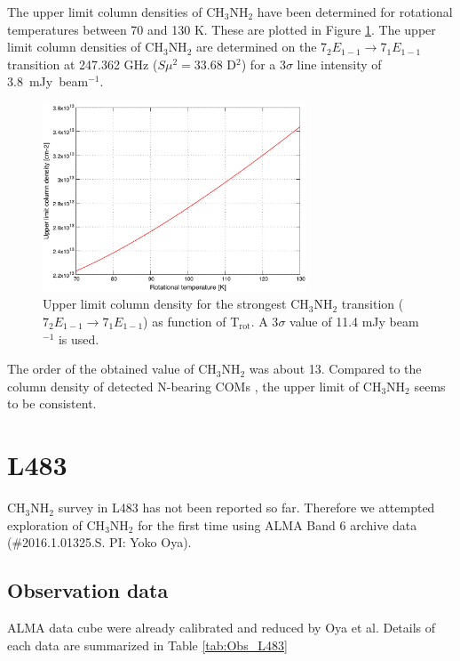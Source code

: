 The upper limit column densities of CH$_{3}$NH$_{2}$ have been
determined for rotational temperatures between 70 and 130 K.
These are plotted in Figure \ref{IRAS16293_MA}.
The upper limit column densities of CH$_{3}$NH$_{2}$ are determined on the
$7_{2}E_{1-1} \rightarrow 7_{1}E_{1-1}$ transition at 247.362 GHz ($S\mu^2 = 33.68$ D$^2$) for a 3$\sigma$ line intensity of 3.8~mJy~beam$^{-1}$.

\begin{figure}[htp]
  \centering
  \includegraphics[width=0.7\textwidth]{LMSFR/IRAS16293.eps}
  \caption{Upper limit column density for the strongest CH$_{3}$NH$_{2}$ transition
  ($7_{2}E_{1-1} \rightarrow 7_{1}E_{1-1}$) as function of T$_{\textrm{rot}}$. A 3$\sigma$ value of 
  11.4 mJy beam$^{-1}$ is used.}
  \label{IRAS16293_MA}
\end{figure}

The order of the obtained value of CH$_{3}$NH$_{2}$ was about 13.
Compared to the column density of detected N-bearing COMs 
\citep[e.g., 4.4$^{+3.0}_{-1.9}$ $\times$ 10$^{14}$ cm$^{-2}$ for NH$_2$CHO,][]{Kahane+2013}, 
the upper limit of CH$_{3}$NH$_{2}$ seems to be consistent.


\section{L483}
CH$_{3}$NH$_{2}$ survey in L483 has not been reported so far.
Therefore we attempted exploration of CH$_{3}$NH$_{2}$ for the first time using ALMA Band 6 archive data (\#2016.1.01325.S. PI: Yoko Oya).

\subsection{Observation data}
ALMA data cube were already calibrated and reduced by Oya et al. 
Details of each data are summarized in Table \ref{tab:Obs_L483}

